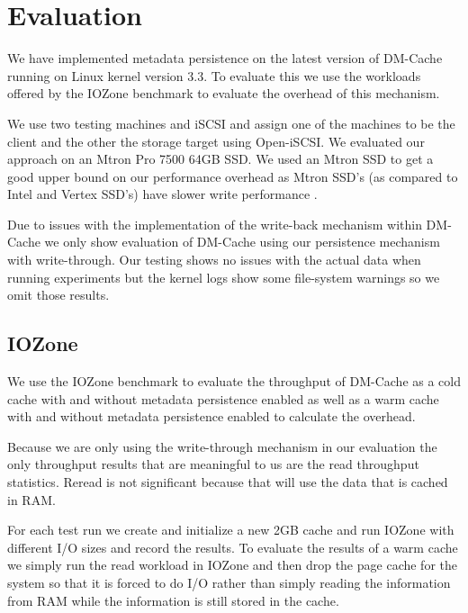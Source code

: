 \section{Evaluation}
\label{sec:evaluation}

We have implemented metadata persistence on the latest version of
DM-Cache running on Linux kernel version 3.3. To evaluate this we use
the workloads offered by the IOZone benchmark to evaluate the overhead
of this mechanism.

We use two testing machines and iSCSI and assign one of the machines
to be the client and the other the storage target using Open-iSCSI. We
evaluated our approach on an Mtron Pro 7500 64GB SSD. We used an Mtron
SSD to get a good upper bound on our performance overhead as Mtron
SSD's (as compared to Intel and Vertex SSD's) have slower write
performance \cite{FIOS}.

Due to issues with the implementation of the write-back mechanism
within DM-Cache we only show evaluation of DM-Cache using our
persistence mechanism with write-through. Our testing shows no issues
with the actual data when running experiments but the kernel logs show
some file-system warnings so we omit those results.

\subsection{IOZone}

We use the IOZone benchmark to evaluate the throughput of DM-Cache as
a cold cache with and without metadata persistence enabled as well as
a warm cache with and without metadata persistence enabled to
calculate the overhead.

Because we are only using the write-through mechanism in our
evaluation the only throughput results that are meaningful to us are
the read throughput statistics. Reread is not significant because that
will use the data that is cached in RAM.

For each test run we create and initialize a new 2GB cache and run
IOZone with different I/O sizes and record the results. To evaluate
the results of a warm cache we simply run the read workload in IOZone
and then drop the page cache for the system so that it is forced to do
I/O rather than simply reading the information from RAM while the
information is still stored in the cache.

